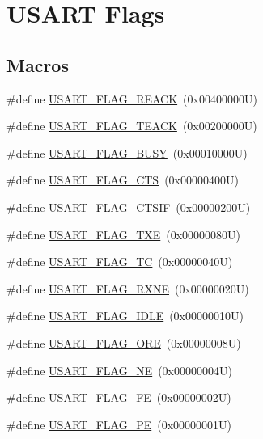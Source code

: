 \hypertarget{group___u_s_a_r_t___flags}{}\section{U\+S\+A\+RT Flags}
\label{group___u_s_a_r_t___flags}
\subsection*{Macros}
\begin{DoxyCompactItemize}
\item 
\#define \hyperlink{group___u_s_a_r_t___flags_gafd437e5c2503128213cf38aed78bc9e6}{U\+S\+A\+R\+T\+\_\+\+F\+L\+A\+G\+\_\+\+R\+E\+A\+CK}~(0x00400000\+U)
\item 
\#define \hyperlink{group___u_s_a_r_t___flags_gadf076898b631433dc47d6313cb2ecb1e}{U\+S\+A\+R\+T\+\_\+\+F\+L\+A\+G\+\_\+\+T\+E\+A\+CK}~(0x00200000\+U)
\item 
\#define \hyperlink{group___u_s_a_r_t___flags_gac21e6b7a6f6374c3c9a0b95341587920}{U\+S\+A\+R\+T\+\_\+\+F\+L\+A\+G\+\_\+\+B\+U\+SY}~(0x00010000\+U)
\item 
\#define \hyperlink{group___u_s_a_r_t___flags_ga94b7272319cca88a65075d5cb6048441}{U\+S\+A\+R\+T\+\_\+\+F\+L\+A\+G\+\_\+\+C\+TS}~(0x00000400\+U)
\item 
\#define \hyperlink{group___u_s_a_r_t___flags_ga5d572d830838cbe7bc9180901ab4192c}{U\+S\+A\+R\+T\+\_\+\+F\+L\+A\+G\+\_\+\+C\+T\+S\+IF}~(0x00000200\+U)
\item 
\#define \hyperlink{group___u_s_a_r_t___flags_ga7129f13333f2a7218838cc32fe507bfa}{U\+S\+A\+R\+T\+\_\+\+F\+L\+A\+G\+\_\+\+T\+XE}~(0x00000080\+U)
\item 
\#define \hyperlink{group___u_s_a_r_t___flags_gae7b85c9e2cc86af5bbc8b8d8b854410f}{U\+S\+A\+R\+T\+\_\+\+F\+L\+A\+G\+\_\+\+TC}~(0x00000040\+U)
\item 
\#define \hyperlink{group___u_s_a_r_t___flags_ga11d6b70c8f00216b6d8a43790dfdcf2f}{U\+S\+A\+R\+T\+\_\+\+F\+L\+A\+G\+\_\+\+R\+X\+NE}~(0x00000020\+U)
\item 
\#define \hyperlink{group___u_s_a_r_t___flags_gac2f1ccc91a834f9cbec3f058872b972a}{U\+S\+A\+R\+T\+\_\+\+F\+L\+A\+G\+\_\+\+I\+D\+LE}~(0x00000010\+U)
\item 
\#define \hyperlink{group___u_s_a_r_t___flags_gabdb285b5c1876d93f9c802f9304538d5}{U\+S\+A\+R\+T\+\_\+\+F\+L\+A\+G\+\_\+\+O\+RE}~(0x00000008\+U)
\item 
\#define \hyperlink{group___u_s_a_r_t___flags_ga81781d27ffc8b85dfaf7b7b791229547}{U\+S\+A\+R\+T\+\_\+\+F\+L\+A\+G\+\_\+\+NE}~(0x00000004\+U)
\item 
\#define \hyperlink{group___u_s_a_r_t___flags_ga3551a32bac49a2ec040e5fdafcc9c4bd}{U\+S\+A\+R\+T\+\_\+\+F\+L\+A\+G\+\_\+\+FE}~(0x00000002\+U)
\item 
\#define \hyperlink{group___u_s_a_r_t___flags_ga5e87fde5704f27c75df25395e23404ad}{U\+S\+A\+R\+T\+\_\+\+F\+L\+A\+G\+\_\+\+PE}~(0x00000001\+U)
\end{DoxyCompactItemize}


